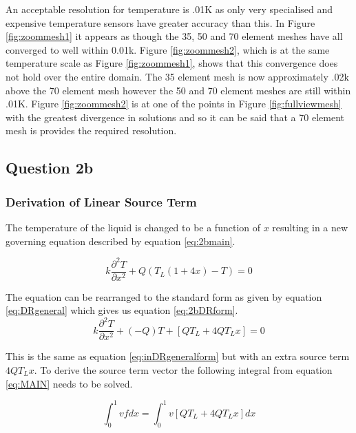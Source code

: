 \documentclass[11pt]{article}
\begin{document}
An acceptable resolution for temperature is .01K as only very specialised and expensive temperature sensors have greater accuracy than this. In Figure \ref{fig:zoommesh1} it appears as though the 35, 50 and 70 element meshes have all converged to well within 0.01k. Figure \ref{fig:zoommesh2}, which is at the same temperature scale as Figure \ref{fig:zoommesh1}, shows that this convergence does not hold over the entire domain. The 35 element mesh is now approximately .02k above the 70 element mesh however the 50 and 70 element meshes are still within .01K. Figure \ref{fig:zoommesh2} is at one of the points in Figure \ref{fig:fullviewmesh} with the greatest divergence in solutions and so it can be said that a 70 element mesh is provides the required resolution.

\clearpage

\subsection{Question 2b}

\subsubsection{Derivation of Linear Source Term}

The temperature of the liquid is changed to be a function of $x$  resulting in a new governing equation described by equation \ref{eq:2bmain}.

\begin{equation} \label{eq:2bmain}
k \frac{\partial^2 T}{\partial x^2} + Q(T_L(1 + 4x) - T) = 0
\end{equation}



The equation can be rearranged to the standard form as given by equation \ref{eq:DRgeneral} which gives us equation \ref{eq:2bDRform}.
\begin{equation} \label{eq:2bDFform}
k \frac{\partial^2 T}{\partial x^2} + (-Q)T + \left [ QT_L + 4QT_Lx \right ] = 0
\end{equation}

This is the same as equation \ref{eq:inDRgeneralform} but with an extra source term $4QT_Lx$. To derive the source term vector the following integral from equation \ref{eq:MAIN} needs to be solved.

\begin{equation*}
\int_{0}^{1}vf dx = \int_{0}^{1}v\left [ QT_L + 4QT_Lx \right ] dx
\end{equation*}
\end{document}
